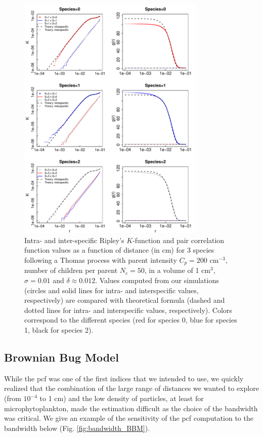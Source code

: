 \documentclass[english]{article}
\begin{document}
\begin{figure}[H]
\begin{centering}
\includegraphics[width=0.8\textwidth]{../code/figure/K_PCF_Thomas}
\par\end{centering}
\caption{Intra- and inter-specific Ripley's $K$-function and pair correlation
function values as a function of distance (in cm) for 3 species following
a Thomas process with parent intensity $C_{p}=200$ cm$^{-3}$, number
of children per parent $N_{c}=50$, in a volume of 1 cm$^{3}$, $\sigma=0.01$
and $\delta\approx0.01$2. Values computed from our simulations (circles
and solid lines for intra- and interspecific values, respectively)
are compared with theoretical formula (dashed and dotted lines for
intra- and interspecific values, respectively). Colors correspond
to the different species (red for species 0, blue for species 1, black
for species 2). }
\end{figure}


\subsection{Brownian Bug Model}

While the pcf was one of the first indices that we intended to use,
we quickly realized that the combination of the large range of distances
we wanted to explore (from $10^{-4}$ to 1 cm) and the low density
of particles, at least for microphytoplankton, made the estimation
difficult as the choice of the bandwidth was critical. We give an
example of the sensitivity of the pcf computation to the bandwidth
below (Fig. \ref{fig:bandwidth_BBM}).
\end{document}

